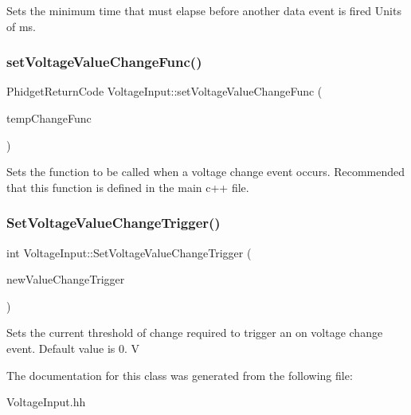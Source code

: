 Sets the minimum time that must elapse before another data event is fired Units of ms.\mbox{\label{classVoltageInput_a19840a54615035bc2da72a39c8b18452}} 
\subsubsection{\texorpdfstring{set\+Voltage\+Value\+Change\+Func()}{setVoltageValueChangeFunc()}}
{\footnotesize\ttfamily Phidget\+Return\+Code Voltage\+Input\+::set\+Voltage\+Value\+Change\+Func (\begin{DoxyParamCaption}\item[{Phidget\+Voltage\+Input\+\_\+\+On\+Voltage\+Change\+Callback}]{temp\+Change\+Func }\end{DoxyParamCaption})\hspace{0.3cm}{\ttfamily [inline]}}

Sets the function to be called when a voltage change event occurs. Recommended that this function is defined in the main c++ file.\mbox{\label{classVoltageInput_a529c29c46852bb170dbee6733cd176e3}} 
\subsubsection{\texorpdfstring{Set\+Voltage\+Value\+Change\+Trigger()}{SetVoltageValueChangeTrigger()}}
{\footnotesize\ttfamily int Voltage\+Input\+::\+Set\+Voltage\+Value\+Change\+Trigger (\begin{DoxyParamCaption}\item[{double}]{new\+Value\+Change\+Trigger }\end{DoxyParamCaption})\hspace{0.3cm}{\ttfamily [inline]}}

Sets the current threshold of change required to trigger an on voltage change event. Default value is 0. V

The documentation for this class was generated from the following file\+:\begin{DoxyCompactItemize}
\item 
Voltage\+Input.\+hh\end{DoxyCompactItemize}
